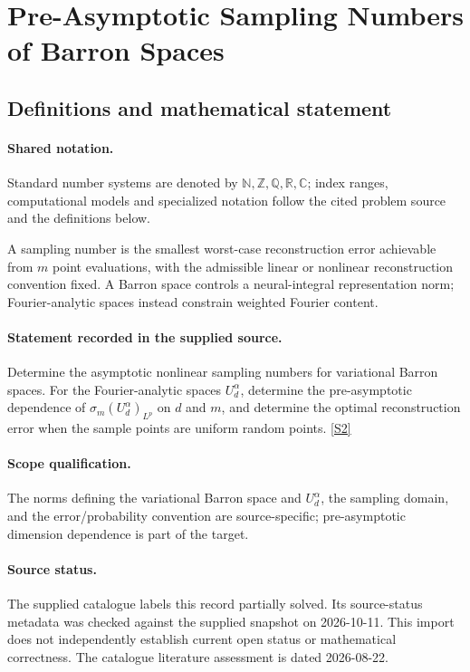\documentclass[11pt]{article}
\newcommand{\sref}[2]{\hyperlink{source:#1:#2}{[S#2]}}
\begin{document}
\section{Pre-Asymptotic Sampling Numbers of Barron Spaces}\label{statement}

\subsection{Definitions and mathematical statement}

\paragraph{Shared notation.}Standard number systems are denoted by $\mathbb N,\mathbb Z,\mathbb Q,\mathbb R,\mathbb C$; index ranges, computational models and specialized notation follow the cited problem source and the definitions below.


A sampling number is the smallest worst-case reconstruction error achievable from $m$ point evaluations, with the admissible linear or nonlinear reconstruction convention fixed. A Barron space controls a neural-integral representation norm; Fourier-analytic spaces instead constrain weighted Fourier content.
\paragraph{Statement recorded in the supplied source.}
Determine the asymptotic nonlinear sampling numbers for variational Barron spaces. For the Fourier-analytic spaces $U_d^\alpha$, determine the pre-asymptotic dependence of $\sigma_m(U_d^\alpha)_{L^p}$ on $d$ and $m$, and determine the optimal reconstruction error when the sample points are uniform random points. \sref{statement}{2}
\paragraph{Scope qualification.}
The norms defining the variational Barron space and $U_d^\alpha$, the sampling domain, and the error/probability convention are source-specific; pre-asymptotic dimension dependence is part of the target.
\paragraph{Source status.}
The supplied catalogue labels this record partially solved. Its source-status metadata was checked against the supplied snapshot on 2026-10-11. This import does not independently establish current open status or mathematical correctness. The catalogue literature assessment is dated 2026-08-22.
\end{document}
